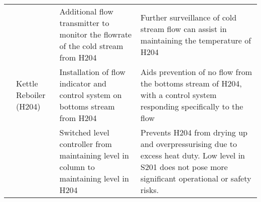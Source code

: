 \begin{table}
\begin{tabularx}{\linewidth}{@{}l>{\raggedright}p{2cm}XX@{}}
    &                            &  Additional flow transmitter to monitor the flowrate of the cold stream from H204    &  Further surveillance of cold stream flow can assist in maintaining the temperature of H204 
    \\ \cmidrule(l){2-4} 
    & Kettle Reboiler (H204)           &          Installation of flow indicator and control system on bottoms stream from H204                                                                                                                                                     &               Aids prevention of no flow from the bottoms stream of H204, with a control system responding specifically to the flow                                                                                                                                                                                               \\ \cmidrule(l){3-4} 
    &                           &      Switched level controller from maintaining level in column to maintaining level in H204                                                                                                                                                          &            Prevents H204 from drying up and overpressurising due to excess heat duty. Low level in S201 does not pose more significant operational or safety risks.                                                                                                                                                                                                                                  \\ \bottomrule
\end{tabularx}%
\end{table}
